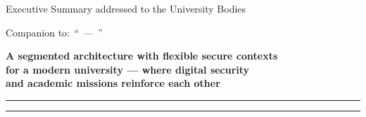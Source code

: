 \documentclass[12pt,a4paper,twoside]{article}
\begin{document}
\begin{center}
\vspace*{-0.2cm}

{\suittitlelogo[0.30\textwidth]}

\smallskip
{\Large\bfseries \suitpolicytitle}

\smallskip

{\normalsize\itshape \suitpolicysubtitle}

\smallskip

\suiteditionline[\normalsize]

\smallskip

{\small Executive Summary addressed to the University Bodies}

\smallskip

{\scriptsize Companion to: \emph{``\suitpolicytitle\ --- \suitpolicysubtitle''}}

\smallskip

\suitmetablock

\medskip

\begin{tcolorbox}[
    colback=NavyBlue!8!white,
    colframe=NavyBlue!85!black,
    boxrule=1.2pt,
    arc=3pt,
    left=10pt, right=10pt, top=8pt, bottom=8pt,
    halign=center
]
{\normalsize\bfseries A segmented architecture with flexible secure contexts\\[3pt]
for a modern university --- where digital security\\[3pt]
and academic missions reinforce each other}
\end{tcolorbox}

\end{center}

\smallskip
\noindent\rule{\textwidth}{0.6pt}



\vspace{1em}
\noindent\rule{\textwidth}{0.4pt}
\printbibliography[title={\normalsize References}]

\printabstractappendix
\end{document}
